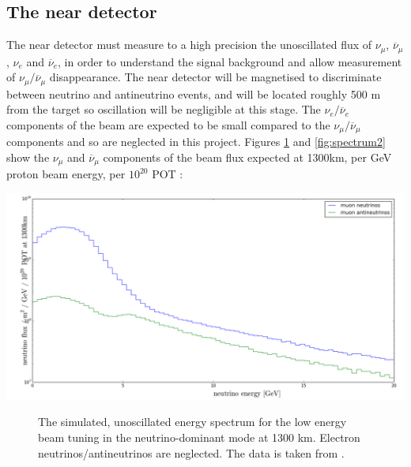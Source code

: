 \documentclass[12pt]{article}
\begin{document}
\subsection{The near detector}
The near detector must measure to a high precision the unoscillated flux of $\nu_{\mu}$, $\overline{\nu}_{\mu}$, $\nu_{e}$ and $\overline{\nu}_{e}$, in order to understand the signal background and allow measurement of $\nu_{\mu}/\overline{\nu}_{\mu}$ disappearance. The near detector will be magnetised to discriminate between neutrino and antineutrino events, and will be located roughly 500 m from the target so oscillation will be negligible at this stage. The $\nu_{e}/\overline{\nu}_{e}$ components of the beam are expected to be small compared to the $\nu_{\mu}/\overline{\nu}_{\mu}$ components and so are neglected in this project. Figures \ref{fig:spectrum1} and \ref{fig:spectrum2} show the $\nu_{\mu}$ and $\overline{\nu}_{\mu}$ components of the beam flux expected at 1300km, per GeV proton beam energy, per $10^{20}$ POT \cite{LBNE}:
\begin{center}
\includegraphics[scale=0.4]{neutrino_beam.png}
\begin{figure}[h!]
\caption{The simulated, unoscillated energy spectrum for the low energy beam tuning in the neutrino-dominant mode at 1300 km. Electron neutrinos/antineutrinos are neglected. The data is taken from \cite{LBNE}.}
\label{fig:spectrum1}
\end{figure}
\end{center}\\\\
\end{document}
